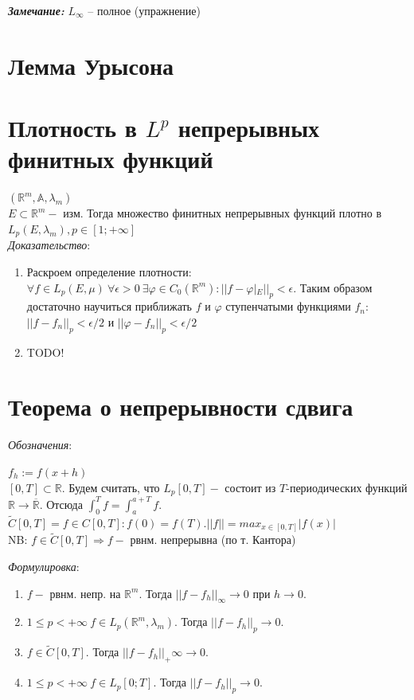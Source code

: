 \documentclass[paper=a4, fontsize=17pt]{article}
\begin{document}
\textbf{\emph{Замечание:}} $ L_{\infty} $ -- полное (упражнение)

\section{Лемма Урысона}

\section{Плотность в $L^p$ непрерывных финитных функций}
$(\mathbb{R}^m, \mathbb{A}, \lambda_m)$\\

$E \subset \mathbb{R}^m -$ изм. Тогда множество финитных непрерывных функций плотно в $L_p(E, \lambda_m), p \in [1; +\infty]$\\

\emph{Доказательство}: 

\begin{enumerate}
	\item  Раскроем определение плотности: $\forall f \in L_p(E, \mu) \ \forall \epsilon > 0 \ \exists \varphi \in C_0(\mathbb{R}^m): ||f - \varphi|_E ||_p < \epsilon$. Таким образом достаточно научиться приближать $f$ и  $\varphi$ ступенчатыми функциями $f_n$: $||f-f_n||_p < \epsilon /2 $ и $||\varphi-f_n||_p < \epsilon /2 $ 

	\item	 TODO!
	
\end{enumerate}


\section{Теорема о непрерывности сдвига}
\emph{Обозначения}: 

$f_h := f(x+h)$ \\
$[0, T] \subset \mathbb{R}.$ Будем считать, что $L_p[0, T] -$ состоит из $T$-периодических функций $\mathbb{R} \rightarrow \overline {\mathbb{R}}$. Отсюда $\int_{0}^{T} f = \int_{a}^{a+T} f.$ \\
$\widetilde{C}[0, T] = {f \in C[0, T]: f(0) = f(T) }. ||f|| = max_{x\in[0,T]}|f(x)|$ \\
NB: $f \in \widetilde{C}[0, T] \Rightarrow f -$ рвнм. непрерывна (по т. Кантора)

\emph{Формулировка}: 
\begin{enumerate}
	\item $f - $ рвнм. непр. на $\mathbb{R}^m$. Тогда $||f-f_h||_\infty \rightarrow 0$ при $h\rightarrow 0$. 
	\item $1 \leq p < + \infty \ f \in L_p(\mathbb{R}^m, \lambda_m)$. Тогда $||f-f_h||_p \rightarrow 0$.
	\item $f \in \widetilde{C}[0, T]$. Тогда $||f-f_h||_+\infty \rightarrow 0$.
	\item $1 \leq p < + \infty \  f \in L_p[0; T]$. Тогда $||f-f_h||_p \rightarrow 0$.
\end{enumerate}
\end{document}
